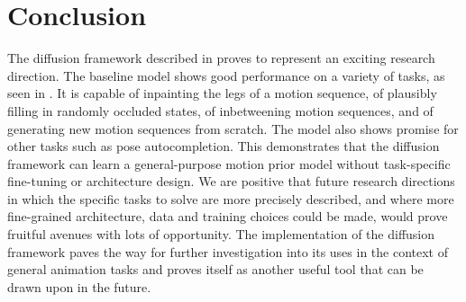 \section{Conclusion}
\label{sec:diffusion_conclusion}

The diffusion framework described in  proves to represent an exciting research direction. The baseline model shows good performance on a variety of tasks, as seen in . It is capable of inpainting the legs of a motion sequence, of plausibly filling in randomly occluded states, of inbetweening motion sequences, and of generating new motion sequences from scratch. The model also shows promise for other tasks such as pose autocompletion. This demonstrates that the diffusion framework can learn a general-purpose motion prior model without task-specific fine-tuning or architecture design. We are positive that future research directions in which the specific tasks to solve are more precisely described, and where more fine-grained architecture, data and training choices could be made, would prove fruitful avenues with lots of opportunity. The implementation of the diffusion framework paves the way for further investigation into its uses in the context of general animation tasks and proves itself as another useful tool that can be drawn upon in the future.